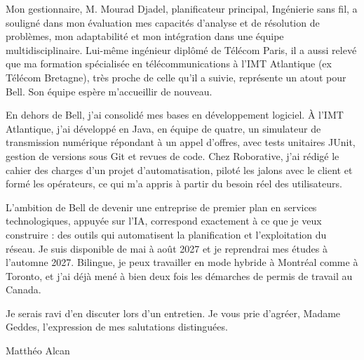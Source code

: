 \documentclass[11pt,a4paper]{article}
\begin{document}
Mon gestionnaire, M. Mourad Djadel, planificateur principal, Ingénierie sans fil, a souligné dans mon évaluation mes capacités d'analyse et de résolution de problèmes, mon adaptabilité et mon intégration dans une équipe multidisciplinaire. Lui-même ingénieur diplômé de Télécom Paris, il a aussi relevé que ma formation spécialisée en télécommunications à l'IMT Atlantique (ex Télécom Bretagne), très proche de celle qu'il a suivie, représente un atout pour Bell. Son équipe espère m'accueillir de nouveau.

En dehors de Bell, j'ai consolidé mes bases en développement logiciel. À l'IMT Atlantique, j'ai développé en Java, en équipe de quatre, un simulateur de transmission numérique répondant à un appel d'offres, avec tests unitaires JUnit, gestion de versions sous Git et revues de code. Chez Roborative, j'ai rédigé le cahier des charges d'un projet d'automatisation, piloté les jalons avec le client et formé les opérateurs, ce qui m'a appris à partir du besoin réel des utilisateurs.

L'ambition de Bell de devenir une entreprise de premier plan en services technologiques, appuyée sur l'IA, correspond exactement à ce que je veux construire : des outils qui automatisent la planification et l'exploitation du réseau. Je suis disponible de mai à août 2027 et je reprendrai mes études à l'automne 2027. Bilingue, je peux travailler en mode hybride à Montréal comme à Toronto, et j'ai déjà mené à bien deux fois les démarches de permis de travail au Canada.

Je serais ravi d'en discuter lors d'un entretien. Je vous prie d'agréer, Madame Geddes, l'expression de mes salutations distinguées.

\vspace{14pt}
{\raggedleft Matthéo Alcan\par}
\end{document}

